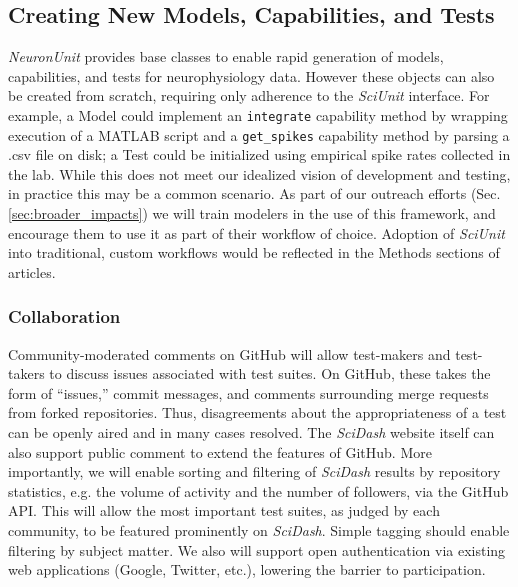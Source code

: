 \documentclass[11pt,letterpaper]{article}
\let\verbx\lstinline
\begin{document}
\subsection{Creating New Models, Capabilities, and Tests}
\textit{NeuronUnit} provides base classes to enable rapid generation of models, capabilities, and tests for neurophysiology data. 
However these objects can also be created from scratch, requiring only adherence to the \textit{SciUnit} interface. 
For example, a Model could implement an \verbx{integrate} capability method by wrapping execution of a MATLAB script and a \verbx{get_spikes} capability method by parsing a .csv file on disk; 
a Test could be initialized using empirical spike rates collected in the lab.  
While this does not meet our idealized vision of development and testing, in practice this may be a common scenario. 
As part of our outreach efforts (Sec. \ref{sec:broader_impacts}) we will train modelers in the use of this framework, and encourage them to use it as part of their workflow of choice. 
Adoption of \textit{SciUnit} into traditional, custom workflows would be reflected in the Methods sections of articles.  

\subsubsection{Collaboration}
Community-moderated comments on GitHub will allow test-makers and test-takers to discuss issues associated with test suites. 
On GitHub, these takes the form of ``issues,'' commit messages, and comments surrounding merge requests from forked repositories. 
Thus, disagreements about the appropriateness of a test can be openly aired and in many cases resolved. 
The \textit{SciDash} website itself can also support public comment to extend the features of GitHub. 
More importantly, we will enable sorting and filtering of \textit{SciDash} results by repository statistics, e.g. the volume of activity and the number of followers, via the GitHub API. 
This will allow the most important test suites, as judged by each community, to be featured prominently on \textit{SciDash}. 
Simple tagging should enable filtering by subject matter. 
We also will support open authentication via existing web applications (Google, Twitter, etc.), lowering the barrier to participation.  
\end{document}
